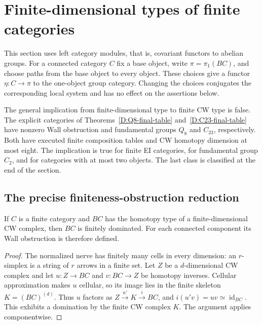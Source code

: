 \section{Finite-dimensional types of finite categories}
\label{sec:D}

This section uses left category modules, that is, covariant functors to
abelian groups.  For a connected category $C$ fix a base object, write
$\pi=\pi_1(BC)$, and choose paths from the base object to every object.
These choices give a functor $\eta:C\to\pi$ to the one-object group
category.  Changing the choices conjugates the corresponding local system
and has no effect on the assertions below.

The general implication from finite-dimensional type to finite CW type
is false. The explicit categories of
Theorems~\ref{D:Q8-final-table} and~\ref{D:C23-final-table} have
nonzero Wall obstruction and fundamental groups $Q_8$ and $C_{23}$,
respectively. Both have executed finite composition tables and CW
homotopy dimension at most eight. The implication is true for finite EI categories,
for fundamental group $C_2$, and for categories with at most two
objects. The last class is classified at the end of the section.

\subsection{The precise finiteness-obstruction reduction}

\begin{proposition}
\label{D:domination}
If $C$ is a finite category and $BC$ has the homotopy type of a
finite-dimensional CW complex, then $BC$ is finitely dominated.  For each
connected component its Wall obstruction is therefore defined.
\end{proposition}
\begin{proof}
The normalized nerve has finitely many cells in every dimension: an
$r$-simplex is a string of $r$ arrows in a finite set.  Let $Z$ be a
$d$-dimensional CW complex and let $u:Z\to BC$ and $v:BC\to Z$ be
homotopy inverses.  Cellular approximation makes $u$ cellular, so its
image lies in the finite skeleton $K=(BC)^{(d)}$.  Thus $u$ factors as
$Z\xrightarrow{u'}K\xrightarrow{i}BC$, and
$i(u'v)=uv\simeq\operatorname{id}_{BC}$.  This exhibits a domination
by the finite CW complex $K$.  The argument applies componentwise.
\end{proof}

